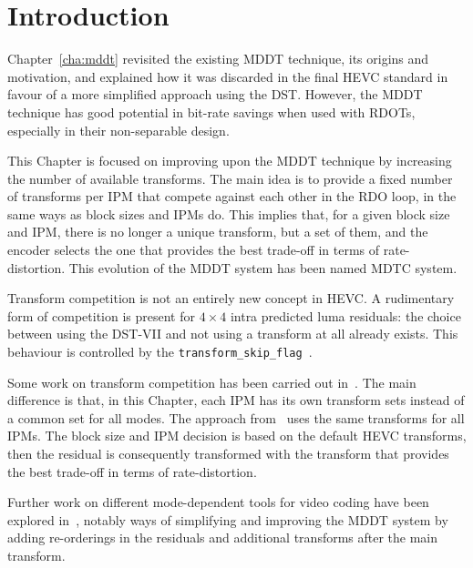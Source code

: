 \documentclass[11pt,a4paper,openright,twoside]{book}
\numberwithin{equation}{section} %
\numberwithin{figure}{section} %
\numberwithin{table}{section} %
\begin{document}
\section{Introduction}
\label{sec:introduction_mdtc}

Chapter~\ref{cha:mddt} revisited the existing \acf{MDDT} technique, its
origins and motivation, and explained how it was discarded in the final
\ac{HEVC} standard in favour of a more simplified approach using the \ac{DST}.
However, the \ac{MDDT} technique has good potential in bit-rate savings when
used with \acp{RDOT}, especially in their non-separable design.

This Chapter is focused on improving upon the \ac{MDDT} technique by
increasing the number of available transforms.
The main idea is to provide a fixed number of transforms per \acf{IPM} that
compete against each other in the \ac{RDO} loop, in the same ways as block
sizes and \acp{IPM} do.
This implies that, for a given block size and \ac{IPM}, there is no longer a
unique transform, but a set of them, and the encoder selects the one that
provides the best trade-off in terms of rate-distortion.
This evolution of the \ac{MDDT} system has been named \ac{MDTC} system.

Transform competition is not an entirely new concept in \ac{HEVC}.
A rudimentary form of competition is present for $4\times4$ intra predicted
luma residuals:
the choice between using the \ac{DST}-VII and not using a transform at all
already exists.
This behaviour is controlled by the
\texttt{transform\_skip\_flag}~\cite{JCTVC-F077, JCTVC-H0208}.

Some work on transform competition has been carried out
in~\cite{arrufat-14-transform-competition-rdot,fengzou-13-rdot-lloyd-intra}.
The main difference is that, in this Chapter, each \ac{IPM} has its own
transform sets instead of a common set for all modes.
The approach from~\cite{fengzou-13-rdot-lloyd-intra} uses the same transforms
for all \acp{IPM}.
The block size and \ac{IPM} decision is based on the default \ac{HEVC}
transforms, then the residual is consequently transformed with the transform
that provides the best trade-off in terms of rate-distortion.

Further work on different mode-dependent tools for video coding have been
explored in~\cite{ma-13-mode-dependent-tools-video-coding}, notably ways of
simplifying and improving the \ac{MDDT} system by adding re-orderings in the
residuals and additional transforms after the main transform.
\end{document}
